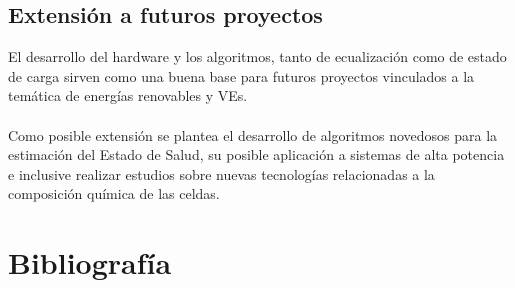 \documentclass[10pt,a4paper]{article}
\begin{document}
	\subsection{Extensión a futuros proyectos}
	
	El desarrollo del hardware y los algoritmos, tanto de ecualización como de estado de carga sirven como una buena base para futuros proyectos vinculados a la temática de energías renovables y VEs.\\
	\\
	Como posible extensión se plantea el desarrollo de algoritmos novedosos para la estimación del Estado de Salud, su posible aplicación a sistemas de alta potencia e inclusive realizar estudios sobre nuevas tecnologías relacionadas a la composición química de las celdas.
	
	\clearpage
	
	\section{Bibliografía}
	
	 
	
	
\end{document}
